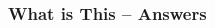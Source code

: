 
\begin{frame}
\frametitle{What is This -- Answers}

\begin{columns}[T]
\begin{column}{0.3\textwidth}
    \begin{enumerate}
    \answers
    \end{enumerate}
\end{column}
\begin{column}{0.7\textwidth}
    \answerimages
\end{column}
\end{columns}

\end{frame}
